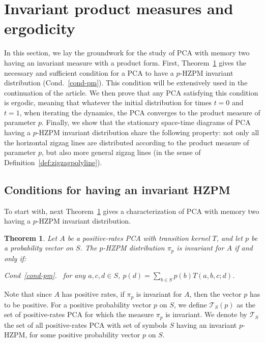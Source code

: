 \documentclass[10pt]{amsart}
\newtheorem{theo}{Theorem}[section]
\theoremstyle{definition}\newtheorem{defi}[theo]{Definition}\newtheorem{rema}[theo]{Remark}\newtheorem{exam}[theo]{Example}\newtheorem{exem}[theo]{Example}\newtheorem{nota}[theo]{Notation}
\newcounter{a}
\newcommand{\Cond}{Cond.}
\newenvironment{conddd}[1]{{\upshape\emph{Cond~\ref{#1}}\pointir}}{}
\newcommand{\triang}[2]{\mathcal{T}_{#1} \left(#2 \right)}
\newcommand{\triangE}[1]{\mathcal{T}_{#1}}
\providecommand{\pointir}{.\ }
\begin{document}
\section{Invariant product measures and ergodicity}\label{sec:cond_ergo}

In this section, we lay the groundwork for the study of PCA with memory two having an invariant measure with a product form. First, Theorem~\ref{theo:gen0} gives the necessary and sufficient condition for a PCA to have a $p$-HZPM invariant distribution (\Cond~\ref{cond-pm}). This condition will be extensively used in the continuation of the article. We then prove that any PCA satisfying this condition is ergodic, meaning that whatever the initial distribution for times $t=0$ and $t=1$, when iterating the dynamics, the PCA converges to the product measure of parameter $p$. Finally, we show that the stationary space-time diagrams of PCA having a $p$-HZPM invariant distribution share the following property: not only all the horizontal zigzag lines are distributed according to the product measure of parameter $p$, but also more general zigzag lines (in the sense of Definition~\ref{def:zigzagpolyline}).

\subsection{Conditions for having an invariant HZPM}

To start with, next Theorem~\ref{theo:gen0} gives a characterization of PCA with memory two having a $p$-HZPM invariant distribution.

\begin{theo}\label{theo:gen0}
Let $A$ be a positive-rates PCA with transition kernel $T$, and let $p$ be a probability vector on $S$. The $p$-HZPM distribution $\pi_p$ is invariant for $A$ if and only if:

\textnormal{\begin{conddd}{cond-pm}
for any $a,c,d\in S$, $p(d) = \sum_{b \in S} p(b) T(a,b,c;d)$.
\end{conddd}}
\end{theo}

Note that since $A$ has positive rates, if $\pi_p$ is invariant for $A$, then the vector $p$ has to be positive. For a positive probability vector $p$ on $S$, we define $\triang{S}{p}$ as the set of positive-rates PCA for which the measure $\pi_p$ is invariant. We denote by $\triangE{S}$ the set of all positive-rates PCA with set of symbols $S$ having an invariant $p$-HZPM, for some positive probability vector $p$ on $S$.
\end{document}
